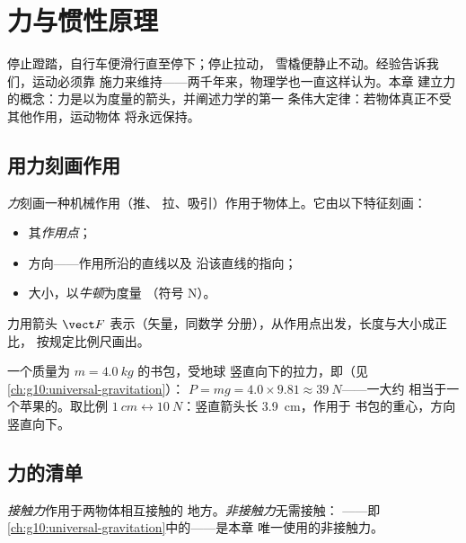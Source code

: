 \chapter{力与惯性原理}\label{ch:g10:inertia}

停止蹬踏，自行车便滑行直至停下；停止拉动，
雪橇便静止不动。经验告诉我们，运动必须靠
施力来维持——两千年来，物理学也一直这样认为。本章
建立力的概念：力是以为度量的箭头，并阐述力学的第一
条伟大定律：若物体真正不受其他作用，运动物体
将永远保持。

\section{用力刻画作用}

\begin{definition}[力]\label{def:g10:inertia:force}
\emph{力}刻画一种机械作用（推、
拉、吸引）作用于物体上。它由以下特征刻画：
\begin{itemize}
  \item 其\emph{作用点}；
  \item 方向——作用所沿的直线以及
        沿该直线的指向；
  \item 大小，以\emph{牛顿}为度量
        （符号 \unit{N}）。
\end{itemize}
力用箭头 $\vect F$ 表示（矢量，同数学
分册），从作用点出发，长度与大小成正比，
按规定比例尺画出。
\end{definition}

\begin{example}[书包的重力]\label{ex:g10:inertia:schoolbag}
一个质量为 $m = \qty{4.0}{kg}$ 的书包，受地球
竖直向下的拉力，即（见\cref{ch:g10:universal-gravitation}）：
$P = mg = 4.0 \times 9.81 \approx \qty{39}{N}$——一大约
相当于一个苹果的。取比例 $\qty{1}{cm} \leftrightarrow
\qty{10}{N}$：竖直箭头长 \qty{3.9}{cm}，作用于
书包的重心，方向竖直向下。
\end{example}

\section{力的清单}

\begin{definition}[接触力与非接触力]\label{def:g10:inertia:contact}
\emph{接触力}作用于两物体相互接触的
地方。\emph{非接触力}无需接触：
——即
\cref{ch:g10:universal-gravitation}中的——是本章
唯一使用的非接触力。
\end{definition}

